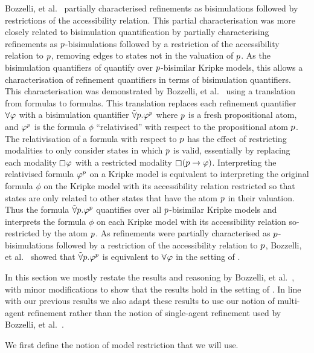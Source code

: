 Bozzelli, et al.~\cite{bozzelli:2014b} partially characterised refinements as bisimulations followed by restrictions of the accessibility relation.
This partial characterisation was more closely related to bisimulation quantification by partially characterising refinements as $p$-bisimulations followed by a restriction of the accessibility relation to $p$, removing edges to states not in the valuation of $p$.
As the bisimulation quantifiers of \logicBqml{} quantify over $p$-bisimilar Kripke models, this allows a characterisation of refinement quantifiers in terms of bisimulation quantifiers.
This characterisation was demonstrated by Bozzelli, et al.~\cite{bozzelli:2014b} using a translation from \langRml{} formulas to \langBqml{} formulas.
This translation replaces each refinement quantifier $\allrefs \phi$ with a bisimulation quantifier ${\tilde\forall {p} . } \varphi^p$ where $p$ is a fresh propositional atom, and $\varphi^p$ is the formula $\phi$ ``relativised'' with respect to the propositional atom $p$.
The relativisation of a formula with respect to $p$ has the effect of restricting modalities to only consider states in which $p$ is valid, essentially by replacing each modality $\necessary \phi$ with a restricted modality $\necessary (\atomP \implies \phi)$.
Interpreting the relativised formula $\varphi^p$ on a Kripke model is equivalent to interpreting the original formula $\phi$ on the Kripke model with its accessibility relation restricted so that states are only related to other states that have the atom $p$ in their valuation.
Thus the formula ${\tilde\forall {p} . } \varphi^p$ quantifies over all $p$-bisimilar Kripke models and interprets the formula $\phi$ on each Kripke model with its accessibility relation so-restricted by the atom $p$.
As refinements were partially characterised as $p$-bisimulations followed by a restriction of the accessibility relation to $p$, Bozzelli, et al.~\cite{bozzelli:2014b} showed that ${\tilde\forall {p} . } \varphi^p$ is equivalent to $\allrefs \phi$ in the setting of \classK{}.

In this section we mostly restate the results and reasoning by Bozzelli, et al.~\cite{bozzelli:2014b}, with minor modifications to show that the results hold in the setting of \classKF{}.
In line with our previous results we also adapt these results to use our notion of multi-agent refinement rather than the notion of single-agent refinement used by Bozzelli, et al.~\cite{bozzelli:2014b}.

We first define the notion of model restriction that we will use.

